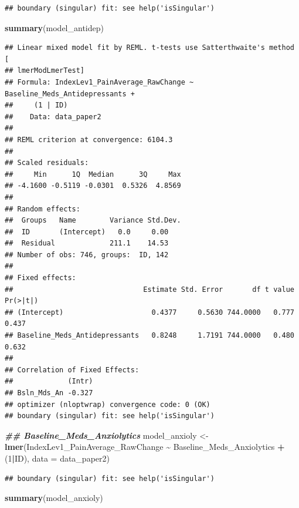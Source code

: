 \documentclass[
  12pt,
]{article}
\newenvironment{Shaded}{\begin{snugshade}}{\end{snugshade}}
\newcommand{\AttributeTok}[1]{\textcolor[rgb]{0.13,0.29,0.53}{#1}}
\newcommand{\DecValTok}[1]{\textcolor[rgb]{0.00,0.00,0.81}{#1}}
\newcommand{\DocumentationTok}[1]{\textcolor[rgb]{0.56,0.35,0.01}{\textbf{\textit{#1}}}}
\newcommand{\FunctionTok}[1]{\textcolor[rgb]{0.13,0.29,0.53}{\textbf{#1}}}
\newcommand{\NormalTok}[1]{#1}
\newcommand{\OtherTok}[1]{\textcolor[rgb]{0.56,0.35,0.01}{#1}}
\newcommand{\SpecialCharTok}[1]{\textcolor[rgb]{0.81,0.36,0.00}{\textbf{#1}}}
\begin{document}
\begin{verbatim}
## boundary (singular) fit: see help('isSingular')
\end{verbatim}

\begin{Shaded}
\begin{Highlighting}[]
\FunctionTok{summary}\NormalTok{(model\_antidep)}
\end{Highlighting}
\end{Shaded}

\begin{verbatim}
## Linear mixed model fit by REML. t-tests use Satterthwaite's method [
## lmerModLmerTest]
## Formula: IndexLev1_PainAverage_RawChange ~ Baseline_Meds_Antidepressants +  
##     (1 | ID)
##    Data: data_paper2
## 
## REML criterion at convergence: 6104.3
## 
## Scaled residuals: 
##     Min      1Q  Median      3Q     Max 
## -4.1600 -0.5119 -0.0301  0.5326  4.8569 
## 
## Random effects:
##  Groups   Name        Variance Std.Dev.
##  ID       (Intercept)   0.0     0.00   
##  Residual             211.1    14.53   
## Number of obs: 746, groups:  ID, 142
## 
## Fixed effects:
##                               Estimate Std. Error       df t value Pr(>|t|)
## (Intercept)                     0.4377     0.5630 744.0000   0.777    0.437
## Baseline_Meds_Antidepressants   0.8248     1.7191 744.0000   0.480    0.632
## 
## Correlation of Fixed Effects:
##             (Intr)
## Bsln_Mds_An -0.327
## optimizer (nloptwrap) convergence code: 0 (OK)
## boundary (singular) fit: see help('isSingular')
\end{verbatim}

\begin{Shaded}
\begin{Highlighting}[]
\DocumentationTok{\#\# Baseline\_Meds\_Anxiolytics}
\NormalTok{model\_anxioly }\OtherTok{\textless{}{-}} \FunctionTok{lmer}\NormalTok{(IndexLev1\_PainAverage\_RawChange }\SpecialCharTok{\textasciitilde{}}\NormalTok{ Baseline\_Meds\_Anxiolytics }\SpecialCharTok{+}\NormalTok{ (}\DecValTok{1}\SpecialCharTok{|}\NormalTok{ID), }\AttributeTok{data =}\NormalTok{ data\_paper2)}
\end{Highlighting}
\end{Shaded}

\begin{verbatim}
## boundary (singular) fit: see help('isSingular')
\end{verbatim}

\begin{Shaded}
\begin{Highlighting}[]
\FunctionTok{summary}\NormalTok{(model\_anxioly)}
\end{Highlighting}
\end{Shaded}
\end{document}
